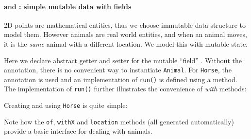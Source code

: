%
%

\paragraph{\Q@Animal@ and \Q@Horse@: simple mutable data with fields}
2D points are mathematical entities, thus we choose immutable data structure to
model them. However animals are real world entities, and when an animal moves,
it is the \emph{same} animal with a different location. We model this with
mutable state.


\noindent Here we declare abstract getter and setter for the mutable ``field''
\Q@location@.  Without the \mixin annotation, there is no convenient way to
instantiate \texttt{Animal}.  For \texttt{Horse}, the \mixin annotation is used
and an implementation of \texttt{run()} is defined using a \Q@default@
method. The implementation of \texttt{run()} further illustrates the convenience of \emph{with} methods:


\noindent Creating and using \texttt{Horse} is quite simple:


\noindent Note how the \texttt{of}, \texttt{withX} and
\texttt{location} methods (all generated automatically) provide a
basic interface for dealing with animals.

